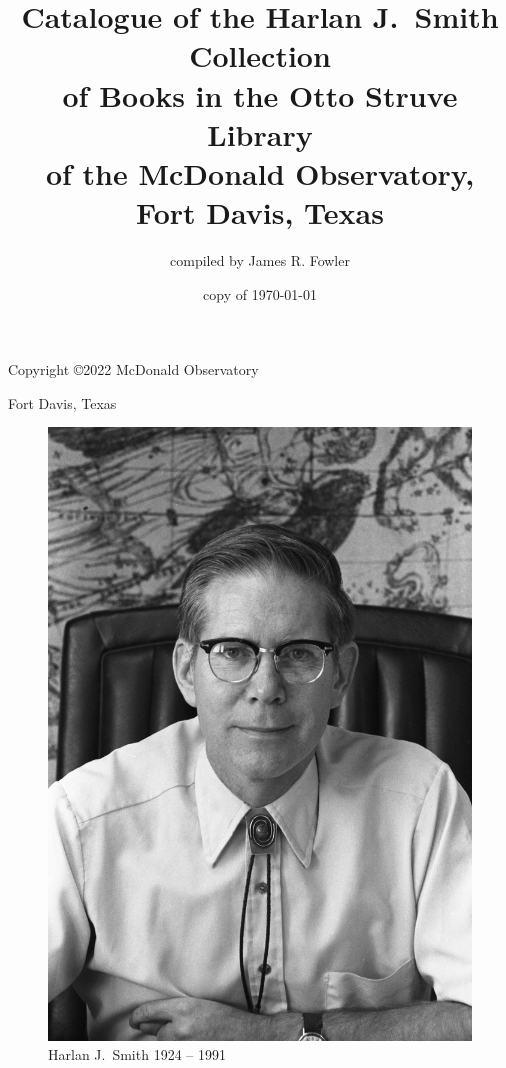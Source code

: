 \documentclass[letterpaper]{book}
\begin{document}
\frontmatter
\pagestyle{empty}
\title{Catalogue of the Harlan J.~Smith Collection \\
  of Books in the Otto Struve Library \\
  of the McDonald Observatory, \\
  Fort Davis, Texas}
\author{compiled by James R. Fowler}
\date{copy of \today}
\maketitle
\newpage

\vspace*{5 in}
\centerline{Copyright \copyright 2022 McDonald Observatory}
\centerline{Fort Davis, Texas}
\newpage

\pagestyle{plain}
\begin{figure}[t]
  \centering
  \includegraphics{hjs_photo.jpg}
  Harlan J.~Smith 1924 -- 1991
  \label{fig:hjs}
\end{figure}
\clearpage
\mbox{}
\thispagestyle{empty}
\newpage
\end{document}
